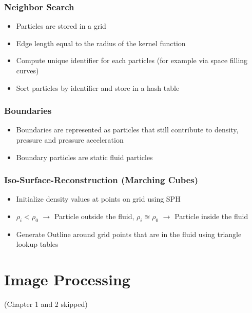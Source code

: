 \documentclass{scrartcl}
\begin{document}
\subsubsection*{Neighbor Search}
\begin{itemize}
    \item Particles are stored in a grid
    \item Edge length equal to the radius of the kernel function
    \item Compute unique identifier for each particles (for example via space filling curves)
    \item Sort particles by identifier and store in a hash table
\end{itemize}
\subsubsection*{Boundaries}
\begin{itemize}
    \item Boundaries are represented as particles that still contribute to density, pressure and pressure acceleration
    \item Boundary particles are static fluid particles
\end{itemize}
\subsubsection*{Iso-Surface-Reconstruction (Marching Cubes)}
\begin{itemize}
    \item Initialize density values at points on grid using SPH
    \item $\rho_i < \rho_0$ $\to$ Particle outside the fluid, $\rho_i \approxeq \rho_0$ $\to$ Particle inside the fluid
    \item Generate Outline around grid points that are in the fluid using triangle lookup tables
\end{itemize}
\newpage
\section*{Image Processing}
(Chapter 1 and 2 skipped)
\end{document}

